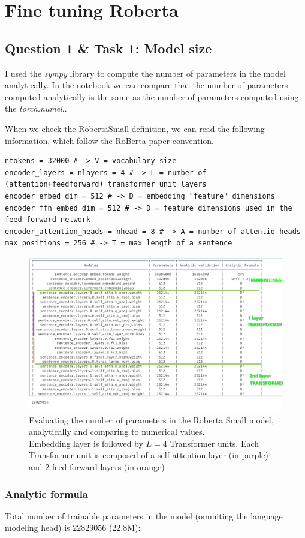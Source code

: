 \documentclass[a4paper]{article}
\begin{document}

\section{Fine tuning Roberta}
\subsection*{Question 1 \& Task 1: Model size}
I used the \textit{sympy} library to compute the number of parameters in the model analytically.
In the notebook we can compare that the number of parameters computed analytically is the same as the number of parameters computed using the \textit{torch.numel}..


When we check the RobertaSmall definition, we can read the following information, which follow the RoBerta paper convention.
\begin{verbatim}
ntokens = 32000 # -> V = vocabulary size
encoder_layers = nlayers = 4 # -> L = number of (attention+feedforward) transformer unit layers
encoder_embed_dim = 512 # -> D = embedding "feature" dimensions
encoder_ffn_embed_dim = 512 # -> D = feature dimensions used in the feed forward network
encoder_attention_heads = nhead = 8 # -> A = number of attentio heads
max_positions = 256 # -> T = max length of a sentence
\end{verbatim}

\begin{figure}[ht]
    \centering
    \includegraphics[width=.6\textwidth]{figures/roberta_params.png}
    \caption{Evaluating the number of parameters in the Roberta Small model, analytically and comparing to numerical values. \\ 
    Embedding layer is followed by $L=4$ Transformer units. Each Transformer unit is composed of a self-attention layer (in purple) and 2 feed forward layers (in orange)}
    \label{fig:roberta_params}
\end{figure}

\subsubsection*{Analytic formula}
Total number of trainable parameters in the model (ommiting the language modeling head) is $22829056$ (22.8M):
\end{document}
